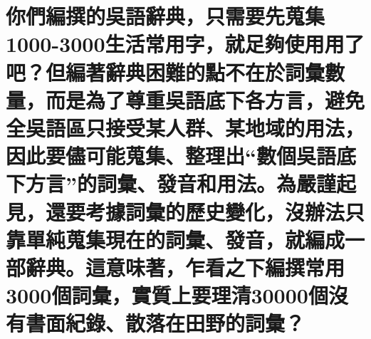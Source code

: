 %

\chapter[你們編撰的吳語辭典，只需要先蒐集1000-3000生活常用字，就足夠使用用了吧？但編著辭典困難的點不在於詞彙數量，而是為了尊重吳語底下各方言，避免全吳語區只接受某人群、某地域的用法，因此要儘可能蒐集、整理出“數個吳語底下方言”的詞彙、發音和用法。為嚴謹起見，還要考據詞彙的歷史變化，沒辦法只靠單純蒐集現在的詞彙、發音，就編成一部辭典。這意味著，乍看之下編撰常用3000個詞彙，實質上要理清30000個沒有書面紀錄、散落在田野的詞彙？]{你們編撰的吳語辭典，只需要先蒐集1000-3000生活常用字，就足夠使用用了吧？但編著辭典困難的點不在於詞彙數量，而是為了尊重吳語底下各方言，避免全吳語區只接受某人群、某地域的用法，因此要儘可能蒐集、整理出“數個吳語底下方言”的詞彙、發音和用法。為嚴謹起見，還要考據詞彙的歷史變化，沒辦法只靠單純蒐集現在的詞彙、發音，就編成一部辭典。這意味著，乍看之下編撰常用3000個詞彙，實質上要理清30000個沒有書面紀錄、散落在田野的詞彙？}

